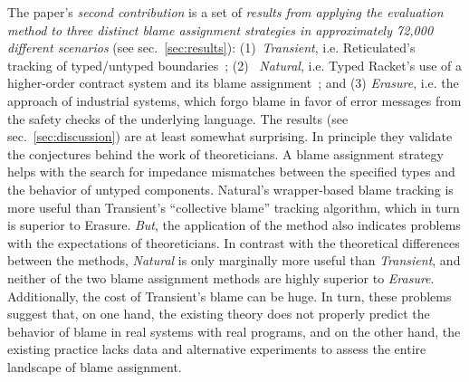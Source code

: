 The paper's {\it second contribution\/} is a set of {\em results from
applying the evaluation method to three distinct blame assignment
strategies in approximately 72,000 different scenarios\/} (see
sec.~\ref{sec:results}): (1)~{\it Transient\/}, i.e. Reticulated's
tracking of typed/untyped boundaries~\citep{vss-popl-2017}; (2)~{\it
Natural\/}, i.e. Typed Racket's use of a higher-order contract system and
its blame assignment~\citep{ff-icfp-2002}; and (3) {\it Erasure\/}, i.e.
the approach of industrial systems, which forgo blame in favor of error
messages from the safety checks of the underlying language. The results
(see sec.~\ref{sec:discussion}) are at least somewhat surprising.  In
principle they validate the conjectures behind the work of theoreticians.
A blame assignment strategy helps with the search for
impedance mismatches between the specified types and the behavior of
untyped components.  Natural's wrapper-based blame tracking is
more useful than Transient's ``collective blame'' tracking algorithm,
which in turn is superior to Erasure. {\em But\/}, the application of the
method also indicates problems with the expectations of theoreticians. 
In contrast with the theoretical differences between the methods,
{\it Natural\/} is only marginally more useful than {\it Transient\/}, and neither of the two
blame assignment methods are highly superior to {\it Erasure\/}. Additionally, 
the cost of Transient's blame can be huge.  In turn, these
problems suggest that, on one hand, the existing theory does not properly
predict the behavior of blame in real systems with real programs,
and on the other hand, the existing practice lacks data and alternative
experiments to assess the entire landscape of blame assignment. 
